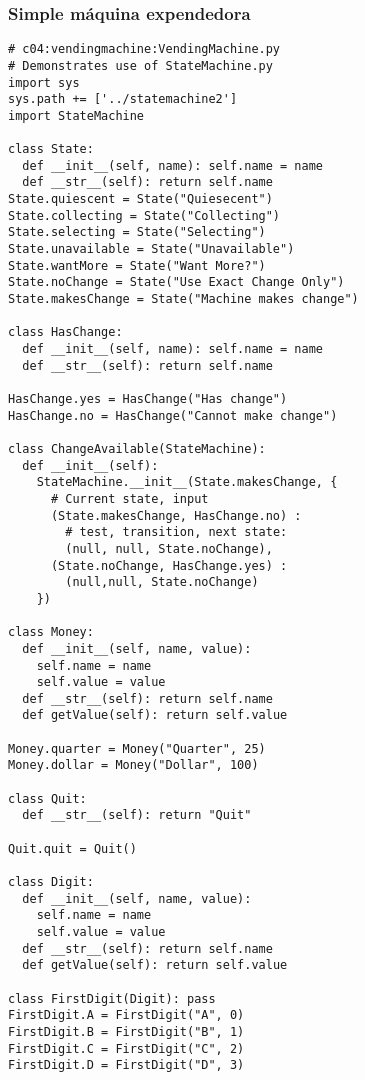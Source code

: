 \subsubsection*{Simple máquina expendedora}
\label{subsubsec:sme}

\begin{lstlisting}
# c04:vendingmachine:VendingMachine.py 
# Demonstrates use of StateMachine.py 
import sys 
sys.path += ['../statemachine2'] 
import StateMachine 

class State: 
  def __init__(self, name): self.name = name 
  def __str__(self): return self.name  
State.quiescent = State("Quiesecent") 
State.collecting = State("Collecting") 
State.selecting = State("Selecting") 
State.unavailable = State("Unavailable") 
State.wantMore = State("Want More?") 
State.noChange = State("Use Exact Change Only") 
State.makesChange = State("Machine makes change") 

class HasChange: 
  def __init__(self, name): self.name = name 
  def __str__(self): return self.name  
  
HasChange.yes = HasChange("Has change") 
HasChange.no = HasChange("Cannot make change") 

class ChangeAvailable(StateMachine): 
  def __init__(self): 
    StateMachine.__init__(State.makesChange, { 
      # Current state, input 
      (State.makesChange, HasChange.no) : 
        # test, transition, next state: 
        (null, null, State.noChange), 
      (State.noChange, HasChange.yes) : 
        (null,null, State.noChange) 
    }) 
    
class Money: 
  def __init__(self, name, value): 
    self.name = name 
    self.value = value 
  def __str__(self): return self.name  
  def getValue(self): return self.value 
  
Money.quarter = Money("Quarter", 25) 
Money.dollar = Money("Dollar", 100) 

class Quit: 
  def __str__(self): return "Quit"  
  
Quit.quit = Quit() 

class Digit: 
  def __init__(self, name, value): 
    self.name = name 
    self.value = value 
  def __str__(self): return self.name  
  def getValue(self): return self.value  
  
class FirstDigit(Digit): pass 
FirstDigit.A = FirstDigit("A", 0) 
FirstDigit.B = FirstDigit("B", 1) 
FirstDigit.C = FirstDigit("C", 2) 
FirstDigit.D = FirstDigit("D", 3) 


\end{lstlisting}
